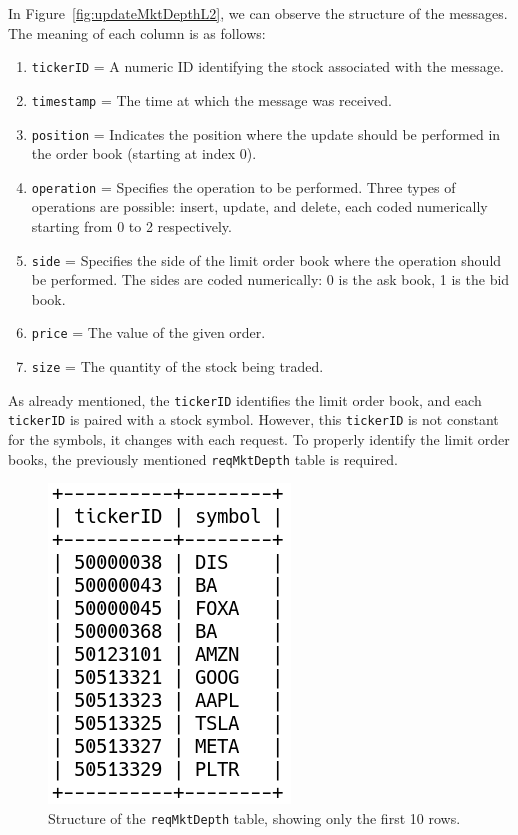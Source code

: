 \documentclass[a4paper,oneside,onecolumn,12pt]{book}
\begin{document}
			In Figure~\ref{fig:updateMktDepthL2}, we can observe the structure of the messages. The meaning of each column is as follows:
			\begin{enumerate}
				\item \texttt{tickerID} = A numeric ID identifying the stock associated with the message. 
				\item \texttt{timestamp} = The time at which the message was received. 
				\item \texttt{position} = Indicates the position where the update should be performed in the order book (starting at index 0). 
				\item \texttt{operation} = Specifies the operation to be performed. Three types of operations are possible: insert, update, and delete, each coded numerically starting from 0 to 2 respectively. 
				\item \texttt{side} = Specifies the side of the limit order book where the operation should be performed. The sides are coded numerically: 0 is the ask book, 1 is the bid book. 
				\item \texttt{price} = The value of the given order. 
				\item \texttt{size} = The quantity of the stock being traded. 
			\end{enumerate}

			As already mentioned, the \texttt{tickerID} identifies the limit order book, and each \texttt{tickerID} is paired with a stock symbol. However, this \texttt{tickerID} is not constant for the symbols, it changes with each request. To properly identify the limit order books, the previously mentioned \texttt{reqMktDepth} table is required.
			\begin{figure}[H]
			\begin{center}
				\includegraphics[scale=0.75]{kep/reqMktDepth.png}
				\caption{Structure of the \texttt{reqMktDepth} table, showing only the first 10 rows.}
				\label{fig:reqMktDepth structure}
			\end{center}
			\end{figure}
\end{document}
